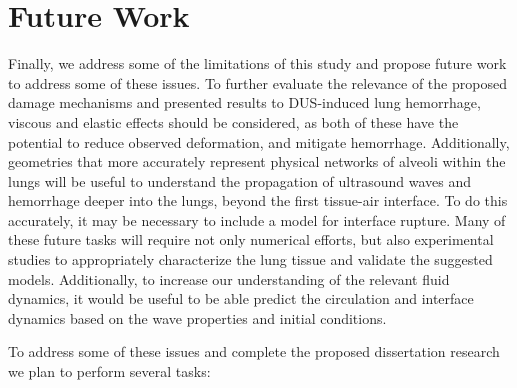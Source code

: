 \section{Future Work} \label{sec:usbe_lung_future}%
Finally, we address some of the limitations of this study and propose
future work to address some of these issues. To further evaluate the
relevance of the proposed damage mechanisms and presented results to
\ac{DUS}-induced lung hemorrhage, viscous and elastic effects should
be considered, as both of these have the potential to reduce observed
deformation, and mitigate hemorrhage. Additionally, geometries that
more accurately represent physical networks of alveoli within the
lungs will be useful to understand the propagation of ultrasound waves
and hemorrhage deeper into the lungs, beyond the first tissue-air
interface. To do this accurately, it may be necessary to include a
model for interface rupture. Many of these future tasks will require
not only numerical efforts, but also experimental studies to
appropriately characterize the lung tissue and validate the suggested
models. Additionally, to increase our understanding of the relevant
fluid dynamics, it would be useful to be able predict the circulation
and interface dynamics based on the wave properties and initial
conditions.

To address some of these issues and complete the proposed dissertation
research we plan to perform several tasks:

